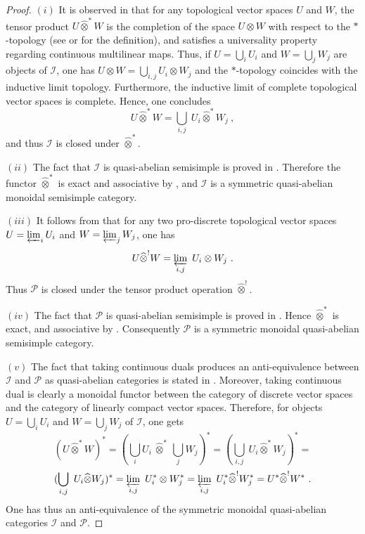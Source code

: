 \documentclass[12pt,reqno]{amsart}
\theoremstyle{definition}
\theoremstyle{remark}
\begin{document}
    \begin{proof}
    $(i)$ It is observed in \cite[Remark~12.1]{Po} that for any topological vector spaces $U$ and $W$, the tensor product $U\widehat{\otimes}^\ast W$ is the completion of the space $U\otimes W$ with respect to the $\ast$-topology (see \cite[1.1(a)]{Bei} or \cite[Section 12]{Po} for the definition), and satisfies a universality property regarding continuous multilinear maps. Thus, if $U = \bigcup_i U_i$ and $W = \bigcup_j W_j$ are objects of $\mathcal{I}$, one has $U\otimes W = \bigcup_{i,j}U_i \otimes W_j$ and the $\ast$-topology coincides with the inductive limit topology. Furthermore, the inductive limit of complete topological vector spaces is complete. Hence, one concludes
    $$
    U \widehat{\otimes}^\ast W = \bigcup_{i,j} \ U_i  \widehat{\otimes}^\ast  W_j \ ,
    $$
    and thus $\mathcal{I}$ is closed under $\widehat{\otimes}^\ast$.

    $(ii)$ The fact that $\mathcal{I}$ is quasi-abelian semisimple is proved in \cite[Proposition~2.9]{EP} . Therefore the functor $\widehat{\otimes}^\ast$ is exact and associative by \cite[Proposition~13.4(a)]{Po} , and $\mathcal{I}$ is a symmetric quasi-abelian monoidal semisimple category.

    $(iii)$ It follows from \cite[1.1(b)]{Bei} that for any two pro-discrete topological vector spaces $U = \varprojlim_i U_i$ and $W = \varprojlim_j W_j$, one has 
    $$
    U \widehat{\otimes}^! W = \varprojlim_{i,j} \ U_i \otimes W_j \ .
    $$
     Thus $\mathcal{P}$ is closed under the tensor product operation $\widehat{\otimes}^!$.   

     $(iv)$ The fact that $\mathcal{P}$ is quasi-abelian semisimple is proved in \cite[Proposition~2.9]{EP}. Hence $\widehat{\otimes}^\ast$ is exact, and associative by \cite[Proposition~13.4(c)]{Po}. Consequently $\mathcal{P}$ is a symmetric monoidal quasi-abelian semisimple category.

     $(v)$ The fact that taking continuous duals produces an anti-equivalence between $\mathcal{I}$ and $\mathcal{P}$ as quasi-abelian categories is stated in \cite[Proposition~2.6]{EP} . Moreover, taking continuous dual is clearly a monoidal functor between the category of discrete vector spaces and the category of linearly compact vector spaces. Therefore, for objects $U = \bigcup_i U_i$ and $W = \bigcup_j W_j$ of $\mathcal{I}$,
     one gets
     $$
     (U\widehat{\otimes}^\ast W)^\ast = (\bigcup_i U_i \ \widehat{\otimes}^\ast \ \bigcup_j W_j)^\ast =
     (\bigcup_{i,j} \ U_i \widehat{\otimes}^\ast W_j)^\ast = 
     $$
     $$
     (\bigcup_{i,j} \ U_i \widehat{\otimes} W_j)^\ast =
     \varprojlim_{i,j} \ U_i^\ast \otimes W_j^\ast = \varprojlim_{i,j} \ U_i^\ast \widehat{\otimes}^! W_j^\ast =
     U^\ast \widehat{\otimes}^! W^\ast  \ .
     $$
     One has thus an anti-equivalence of the symmetric monoidal quasi-abelian categories $\mathcal{I}$ and $\mathcal{P}$.
    \end{proof}
\end{document}
